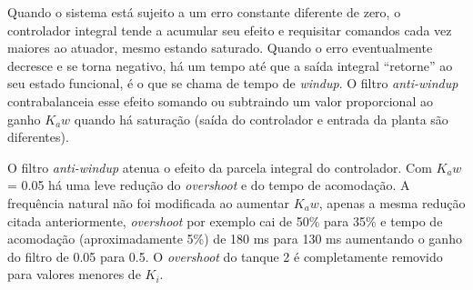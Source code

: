 Quando o sistema está sujeito a um erro constante diferente de zero, o controlador integral tende a acumular seu efeito e requisitar comandos cada vez maiores ao atuador, mesmo estando saturado. Quando o erro eventualmente decresce e se torna negativo, há um tempo até que a saída integral “retorne” ao seu estado funcional, é o que se chama de tempo de \emph{windup}. O filtro \emph{anti-windup} contrabalanceia esse efeito somando ou subtraindo um valor proporcional ao ganho $K_aw$ quando há saturação (saída do controlador e entrada da planta são diferentes).

O filtro \emph{anti-windup} atenua o efeito da parcela integral do controlador. Com $K_aw$ = 0.05 há uma leve redução do \emph{overshoot} e do tempo de acomodação. A frequência natural não foi modificada ao aumentar $K_aw$, apenas a mesma redução citada anteriormente, \emph{overshoot} por exemplo cai de 50\% para 35\% e tempo de acomodação (aproximadamente 5\%) de 180 ms para 130 ms aumentando o ganho do filtro de 0.05 para 0.5. O \emph{overshoot} do tanque 2 é completamente removido para valores menores de $K_i$.

